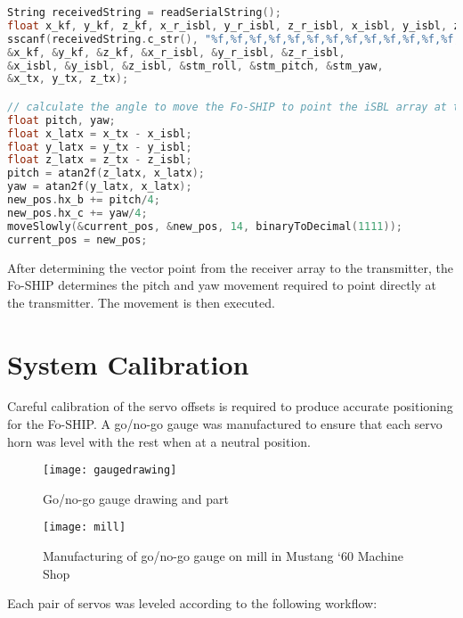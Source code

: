 \documentclass[12pt,a4paper]{report}
\begin{document}
\begin{lstlisting}[language=C++]
String receivedString = readSerialString();
float x_kf, y_kf, z_kf, x_r_isbl, y_r_isbl, z_r_isbl, x_isbl, y_isbl, z_isbl, stm_roll, stm_pitch, stm_yaw, x_tx, y_tx, z_tx;
sscanf(receivedString.c_str(), "%f,%f,%f,%f,%f,%f,%f,%f,%f,%f,%f,%f,%f,%f,%f", 
&x_kf, &y_kf, &z_kf, &x_r_isbl, &y_r_isbl, &z_r_isbl, 
&x_isbl, &y_isbl, &z_isbl, &stm_roll, &stm_pitch, &stm_yaw,
&x_tx, y_tx, z_tx);

// calculate the angle to move the Fo-SHIP to point the iSBL array at the transmitter
float pitch, yaw;
float x_latx = x_tx - x_isbl;
float y_latx = y_tx - y_isbl;
float z_latx = z_tx - z_isbl;
pitch = atan2f(z_latx, x_latx);
yaw = atan2f(y_latx, x_latx);
new_pos.hx_b += pitch/4;
new_pos.hx_c += yaw/4;
moveSlowly(&current_pos, &new_pos, 14, binaryToDecimal(1111));
current_pos = new_pos;
\end{lstlisting}

After determining the vector point from the receiver array to the transmitter, the Fo-SHIP determines the pitch and yaw movement required to point directly at the transmitter. The movement is then executed.

\section{System Calibration} \label{sec:2s6}
Careful calibration of the servo offsets is required to produce accurate positioning for the Fo-SHIP. A go/no-go gauge was manufactured to ensure that each servo horn was level with the rest when at a neutral position.

\begin{figure}[htbp]
	\centering
	\texttt{[image: gaugedrawing]}
	\caption{Go/no-go gauge drawing and part}
	\label{fig:gaugedrawing}
\end{figure}

\begin{figure}[htbp]
	\centering
	\texttt{[image: mill]}
	\caption{Manufacturing of go/no-go gauge on mill in Mustang ‘60 Machine Shop}
	\label{fig:mill}
\end{figure}

\noindent Each pair of servos was leveled according to the following workflow:
\end{document}
